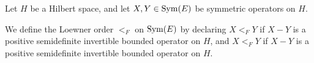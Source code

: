 \documentclass[12pt]{article}
\newcommand{\<}{\langle}
\renewcommand{\>}{\rangle}
\begin{document}
Let $H$ be a Hilbert space, and let $X,Y\in{\rm Sym}(E)$ be symmetric operators on $H$.

We define the Loewner order $<_F$ on ${\rm Sym}(E)$ by declaring $X<_F Y$ if $X-Y$ is a positive semidefinite invertible bounded operator on $H$, and $X<_F Y$ if $X-Y$ is a positive semidefinite invertible bounded operator on $H$.
\end{document}
